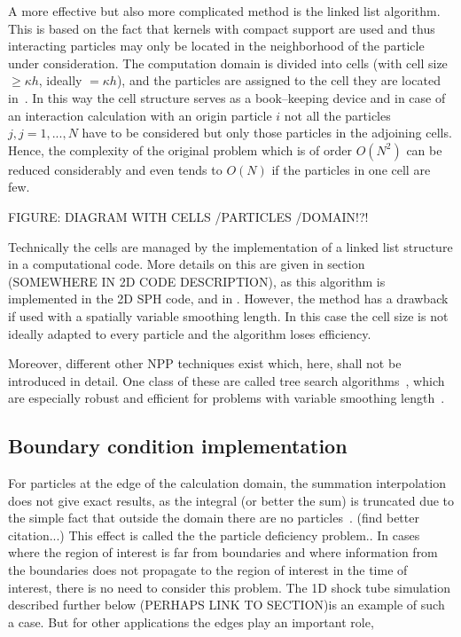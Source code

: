 \documentclass{report}
\begin{document}
A more effective but also more complicated method is the linked list
algorithm. This is based on the fact that kernels with compact support are
used and thus interacting particles may only be located in the neighborhood of
the particle under consideration. The computation domain is divided into cells (with
cell size$\ge \kappa h$, ideally $=\kappa h$), and the
particles are assigned to the cell they are located in~\cite{Monaghan1983}. In this way the cell
structure serves as a book--keeping device and in case of an interaction
calculation with an origin particle $i$ not all the particles $j,j={1,...,N}$ have
to be considered but only those particles in the adjoining cells. Hence, the
complexity of the original problem which is of order $O(N^2)$ can be reduced
considerably and even tends to $O(N)$ if the particles in one cell are few. 

FIGURE: DIAGRAM WITH CELLS /PARTICLES /DOMAIN!?!

Technically the cells are managed by the implementation of a linked list
structure in a computational code. More details on this are given in section
(SOMEWHERE IN 2D CODE DESCRIPTION), as this algorithm is implemented in the 2D
SPH code, and in \cite{Monaghan1985, Hockney1988}.
However, the method has a drawback if used with a spatially variable smoothing
length. In this case the cell size is not ideally adapted to every particle
and the algorithm loses efficiency.

Moreover, different other NPP techniques exist which, here, shall not be introduced in
detail. One class of these are called tree search algorithms~\cite{Hernquist1989}, which are
especially robust and efficient for problems with variable smoothing
length~\cite{Liu2003}.

\subsection{Boundary condition implementation}
\label{sec:boundaryConditionImplementation}
For particles at the edge of the calculation domain, the summation interpolation does not
give exact results, as the integral (or better the sum) is truncated due to
the simple fact that outside the domain there are no
particles~\cite{Liu2003}. (find better citation...) This effect is called the
the particle deficiency
problem.\cite{Liu2003}. In cases where the region of interest is far from boundaries
and where information from the boundaries does not propagate to the region of interest
in the time of interest, there is no need to consider this
problem. 
The 1D shock tube simulation described further below
(PERHAPS LINK TO SECTION)is an example of such a case.  
But for other applications the edges play an important role,
\end{document}
